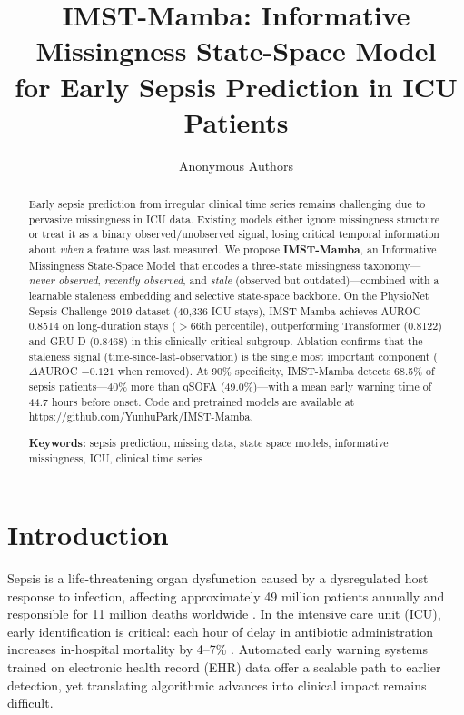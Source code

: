 \documentclass[11pt,a4paper]{article}
\title{\textbf{IMST-Mamba: Informative Missingness State-Space Model\\
       for Early Sepsis Prediction in ICU Patients}}
\author[1]{Anonymous Authors}
\affil[1]{Anonymous Institution}
\date{}
\begin{document}
\maketitle

\begin{abstract}
Early sepsis prediction from irregular clinical time series remains challenging
due to pervasive missingness in ICU data.  Existing models either ignore
missingness structure or treat it as a binary observed/unobserved signal,
losing critical temporal information about \emph{when} a feature was last
measured.  We propose \textbf{IMST-Mamba}, an Informative Missingness
State-Space Model that encodes a three-state missingness taxonomy—\emph{never
observed}, \emph{recently observed}, and \emph{stale} (observed but
outdated)—combined with a learnable staleness embedding and selective
state-space backbone.  On the PhysioNet Sepsis Challenge 2019 dataset
(40,336 ICU stays), IMST-Mamba achieves AUROC 0.8514 on long-duration stays
($>$66th percentile), outperforming Transformer (0.8122) and GRU-D (0.8468) in
this clinically critical subgroup.  Ablation confirms that the staleness signal
(time-since-last-observation) is the single most important component
($\Delta$AUROC $-0.121$ when removed).  At 90\% specificity, IMST-Mamba
detects 68.5\% of sepsis patients—40\% more than qSOFA (49.0\%)—with a mean
early warning time of 44.7 hours before onset.  Code and pretrained models are
available at \url{https://github.com/YunhuPark/IMST-Mamba}.

\noindent\textbf{Keywords:} sepsis prediction, missing data, state space
models, informative missingness, ICU, clinical time series
\end{abstract}

\section{Introduction}
\label{sec:intro}

Sepsis is a life-threatening organ dysfunction caused by a dysregulated host
response to infection, affecting approximately 49 million patients annually and
responsible for 11 million deaths worldwide \citep{singer2016sepsis3}.  In the
intensive care unit (ICU), early identification is critical: each hour of delay
in antibiotic administration increases in-hospital mortality by
4--7\% \citep{kumar2006antibiotic}.  Automated early warning systems trained on
electronic health record (EHR) data offer a scalable path to earlier detection,
yet translating algorithmic advances into clinical impact remains difficult.
\end{document}
